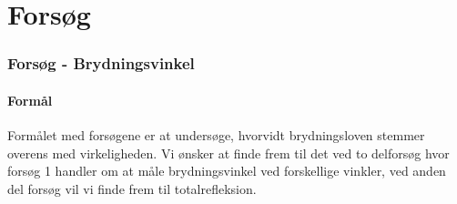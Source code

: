 \part{Forsøg}

\section{Forsøg - Brydningsvinkel}
\subsection{Formål}
Formålet med forsøgene er at undersøge, hvorvidt brydningsloven stemmer overens med virkeligheden. Vi ønsker at finde frem til det ved to delforsøg hvor forsøg 1 handler om at måle brydningsvinkel ved forskellige vinkler, ved anden del forsøg vil vi finde frem til totalrefleksion.

